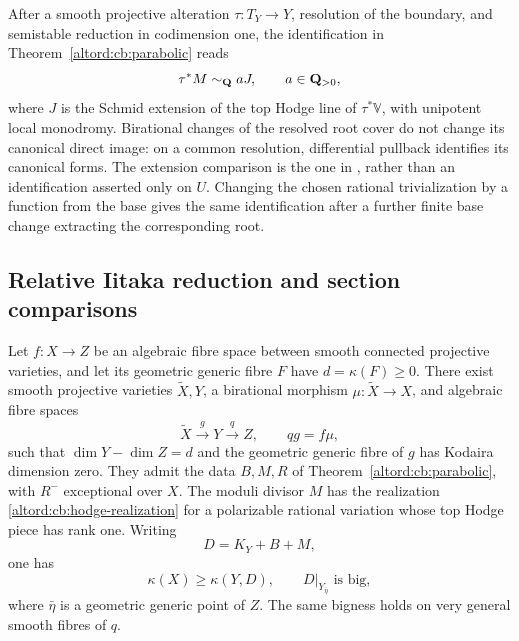 After a smooth projective alteration \(\tau:T_Y\to Y\), resolution
of the boundary, and semistable reduction in codimension one, the
identification in Theorem~\ref{altord:cb:parabolic} reads
\begin{equation}
\label{altord:cb:hodge-realization}
 \tau^*M\sim_{\mathbf Q}aJ,\qquad a\in\mathbf Q_{>0},
\end{equation}
where \(J\) is the Schmid extension of the top Hodge line of
\(\tau^*\mathbb V\), with unipotent local monodromy.
Birational changes of the resolved root cover do not change its
canonical direct image: on a common resolution, differential
pullback identifies its canonical forms.
The extension comparison is the one in
\cite[Theorem~4.4(1),(3), Lemma~5.2(5), and
Proposition~5.5]{AmbroBoundary}, rather than
an identification asserted only on \(U\).
Changing the chosen rational trivialization by a function from
the base gives the same identification after a further finite
base change extracting the corresponding root.

\subsection{Relative Iitaka reduction and section comparisons}

\begin{proposition}
\label{altord:cb:reduction}
Let \(f:X\to Z\) be an algebraic fibre space between smooth connected
projective varieties, and let its geometric generic fibre \(F\) have
\(d=\kappa(F)\geq0\).
There exist smooth projective varieties \(\widetilde X,Y\),
a birational morphism \(\mu:\widetilde X\to X\), and algebraic fibre
spaces
\[
 \widetilde X\xrightarrow{g}Y\xrightarrow{q}Z,\qquad
 qg=f\mu,
\]
such that \(\dim Y-\dim Z=d\) and the geometric generic fibre of
\(g\) has Kodaira dimension zero.
They admit the data \(B,M,R\) of Theorem~\ref{altord:cb:parabolic},
with \(R^-\) exceptional over \(X\).
The moduli divisor \(M\) has the realization
\eqref{altord:cb:hodge-realization} for a polarizable rational variation
whose top Hodge piece has rank one.
Writing
\[
 D=K_Y+B+M,
\]
one has
\begin{equation}
\label{altord:cb:two-comparisons}
 \kappa(X)\geq\kappa(Y,D),
 \qquad
 D|_{Y_{\bar\eta}}\text{ is big},
\end{equation}
where \(\bar\eta\) is a geometric generic point of \(Z\).
The same bigness holds on very general smooth fibres of \(q\).
\end{proposition}

